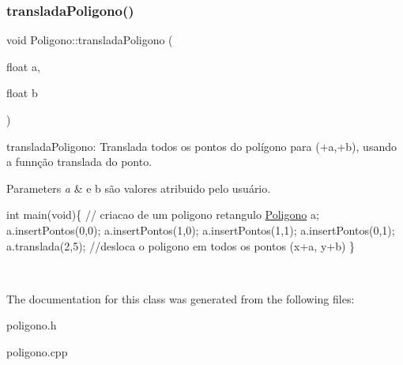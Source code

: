 \subsubsection{\texorpdfstring{translada\+Poligono()}{transladaPoligono()}}
{\footnotesize\ttfamily void Poligono\+::translada\+Poligono (\begin{DoxyParamCaption}\item[{float}]{a,  }\item[{float}]{b }\end{DoxyParamCaption})}



translada\+Poligono\+: Translada todos os pontos do polígono para (+a,+b), usando a funnção translada do ponto. 


\begin{DoxyParams}{Parameters}
{\em a} & e b são valores atribuido pelo usuário. 
\begin{DoxyPre}
int main(void)\{
// criacao de um poligono retangulo
   \mbox{\hyperlink{class_poligono}{Poligono}} a;
   a.insertPontos(0,0);
   a.insertPontos(1,0);
   a.insertPontos(1,1);
   a.insertPontos(0,1);
   a.translada(2,5); //desloca o poligono em todos os pontos (x+a, y+b)
\}
\end{DoxyPre}
 \\
\hline
\end{DoxyParams}


The documentation for this class was generated from the following files\+:\begin{DoxyCompactItemize}
\item 
poligono.\+h\item 
poligono.\+cpp\end{DoxyCompactItemize}
